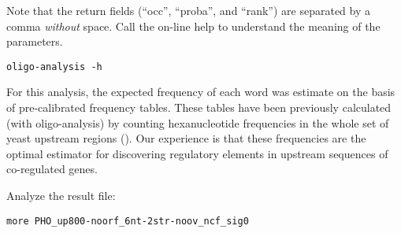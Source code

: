 Note that the return fields (``occ'', ``proba'', and ``rank'') are
separated by a comma \textit{without} space. Call the on-line help to
understand the meaning of the parameters.

{\color{Blue} \begin{footnotesize} 
\begin{verbatim} 
oligo-analysis -h
\end{verbatim} \end{footnotesize}
}


For this analysis, the expected frequency of each word was estimate on
the basis of pre-calibrated frequency tables.  These tables have been
previously calculated (with oligo-analysis) by counting hexanucleotide
frequencies in the whole set of yeast upstream regions (). Our experience is that these frequencies are the optimal
estimator for discovering regulatory elements in upstream sequences of
co-regulated genes.

Analyze the result file:

{\color{Blue} \begin{footnotesize} 
\begin{verbatim}
more PHO_up800-noorf_6nt-2str-noov_ncf_sig0
\end{verbatim} \end{footnotesize}
}


